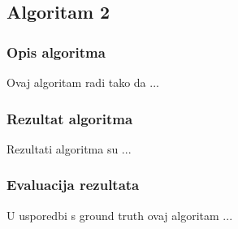 \subsection{Algoritam 2}

\subsubsection{Opis algoritma}
Ovaj algoritam radi tako da ...

\subsubsection{Rezultat algoritma}
Rezultati algoritma su ...

\subsubsection{Evaluacija rezultata}
U usporedbi s ground truth ovaj algoritam ...
